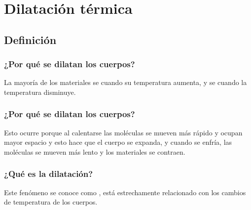 \documentclass[14pt]{beamer}
\begin{document}
\section{Dilatación térmica}
\subsection{Definición}

\begin{frame}
\frametitle{¿Por qué se dilatan los cuerpos?}
La mayoría de los materiales se  cuando su temperatura aumenta, \pause y se  cuando la temperatura disminuye.
\end{frame}
\begin{frame}
\frametitle{¿Por qué se dilatan los cuerpos?}    
Esto ocurre porque al calentarse las moléculas se mueven más rápido y ocupan mayor espacio y esto hace que el cuerpo se expanda, \pause y cuando se enfría, las moléculas se mueven más lento y los materiales se contraen.
\end{frame}
\begin{frame}
\frametitle{¿Qué es la dilatación?}    
Este fenómeno se conoce como , \pause está estrechamente relacionado con los cambios de temperatura de los cuerpos.
\end{frame}
\end{document}
